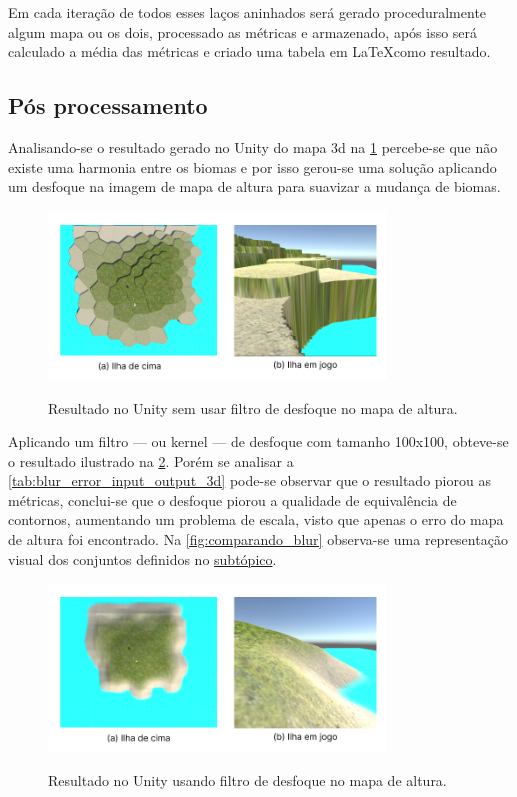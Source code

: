 Em cada iteração de todos esses laços aninhados será gerado proceduralmente algum mapa ou os dois, processado as métricas e armazenado, após isso será calculado a média das métricas e criado uma tabela em \LaTeX como resultado.

\subsection{Pós processamento}
Analisando-se o resultado gerado no Unity do mapa 3d na \cref{fig:Unity_init} percebe-se que não existe uma harmonia entre os biomas e por isso gerou-se uma solução aplicando um desfoque na imagem de mapa de altura para suavizar a mudança de biomas.

\begin{figure}[!ht]
	\centering
    \caption{Resultado no Unity sem usar filtro de desfoque no mapa de altura.}
	\includegraphics[width=0.8\textwidth]{figures/Unity_entry.png}
	\label{fig:Unity_init}
\end{figure}

Aplicando um filtro — ou kernel — de desfoque com tamanho 100x100, obteve-se o resultado ilustrado na \cref{fig:Unity_blur}. Porém se analisar a \cref{tab:blur_error_input_output_3d} pode-se observar que o resultado piorou as métricas, conclui-se que o desfoque piorou a qualidade de equivalência de contornos, aumentando um problema de escala, visto que apenas o erro do mapa de altura foi encontrado. Na \cref{fig:comparando_blur} observa-se uma representação visual dos conjuntos definidos no \hyperref[sec:classificacao_conjuntos]{subtópico}.

\begin{figure}[!ht]
	\centering
    \caption{Resultado no Unity usando filtro de desfoque no mapa de altura.}
	\includegraphics[width=0.8\textwidth]{figures/Unity_blur.png}
	\label{fig:Unity_blur}
\end{figure}

